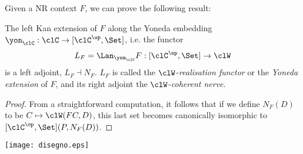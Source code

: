 \documentclass[a4paper]{../birkjour}
\begin{document}
Given a NR context $F$, we can prove the following result:
\begin{proposition}\label{nervereal}
	The left Kan extension of $F$ along the Yoneda embedding $\yon_\clC : \clC\to [\clC^\op, \Set]$, i.e. the functor
	\[L_F=\Lan_{\yon_\clC} F : [\clC^\op, \Set]\to \clW\]
	is a left adjoint, $L_F\dashv N_F$. $L_F$ is called the $\clW$-\emph{realisation functor} or the \emph{Yoneda extension} of $F$, and its right adjoint the $\clW$-\emph{coherent nerve}.
\end{proposition}
\begin{proof}
	From a straightforward computation, it follows that if we define $N_F(D)$ to be $C\mapsto \clW(F C,D)$, this last set becomes canonically isomorphic to $[\clC^\op,\Set](P,N_F(D))$.
\end{proof}
\begin{center}
  \texttt{[image: disegno.eps]}
\end{center}
\end{document}
